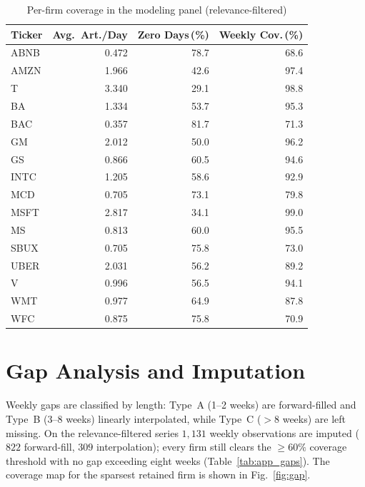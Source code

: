 \documentclass[conference]{IEEEtran}
\begin{document}
\begin{table}[!t]
\caption{Per-firm coverage in the modeling panel (relevance-filtered)}
\label{tab:app_inventory}
\centering
\small
\begin{tabular}{lrrr}
\toprule
Ticker & Avg.\ Art./Day & Zero Days\,(\%) & Weekly Cov.\,(\%) \\
\midrule
ABNB & 0.472 & 78.7 & 68.6 \\
AMZN & 1.966 & 42.6 & 97.4 \\
T    & 3.340 & 29.1 & 98.8 \\
BA   & 1.334 & 53.7 & 95.3 \\
BAC  & 0.357 & 81.7 & 71.3 \\
GM   & 2.012 & 50.0 & 96.2 \\
GS   & 0.866 & 60.5 & 94.6 \\
INTC & 1.205 & 58.6 & 92.9 \\
MCD  & 0.705 & 73.1 & 79.8 \\
MSFT & 2.817 & 34.1 & 99.0 \\
MS   & 0.813 & 60.0 & 95.5 \\
SBUX & 0.705 & 75.8 & 73.0 \\
UBER & 2.031 & 56.2 & 89.2 \\
V    & 0.996 & 56.5 & 94.1 \\
WMT  & 0.977 & 64.9 & 87.8 \\
WFC  & 0.875 & 75.8 & 70.9 \\
\bottomrule
\end{tabular}
\end{table}

\section{Gap Analysis and Imputation}
\label{app:gaps}
Weekly gaps are classified by length: Type~A (1--2 weeks) are forward-filled and
Type~B (3--8 weeks) linearly interpolated, while Type~C ($>8$ weeks) are left
missing. On the relevance-filtered series $1{,}131$ weekly observations are
imputed ($822$ forward-fill, $309$ interpolation); every firm still clears the
$\ge 60\%$ coverage threshold with no gap exceeding eight weeks
(Table~\ref{tab:app_gaps}). The coverage map for the sparsest retained firm is
shown in Fig.~\ref{fig:gap}.
\end{document}
